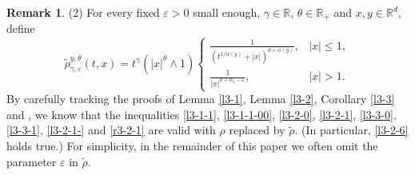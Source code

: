 \documentclass[a4paper,11pt]{amsart}
\renewcommand{\le}{\leqslant}
\newcommand{\R}{\mathds R}
\newcommand{\A}{\alpha}
\newcommand{\G}{\gamma}
\newcommand{\e}{ \varepsilon}
\theoremstyle{definition}
\newtheorem{remark}[theorem]{Remark}
\begin{document}
\begin{remark}
(2) For every fixed $\varepsilon>0$ small enough, $\G\in \R$,
$\theta \in \R_+$ and $x, y \in \R^d$, define
\begin{equation}\label{p3-1-7}
\tilde \rho_{\G,\e}^{y,\theta }(t,x)=t^{\G}(|x|^{\theta}\wedge
1)
\begin{cases}
\frac{1}{(t^{{1/\A(y)}}+|x|)^{d+\A(y)}},&  |x|\le 1,\\
\frac{1}{|x|^{d+\A_1-\varepsilon}},& |x|>1.
\end{cases}
\end{equation}
By carefully tracking the proofs of Lemma \ref{l3-1}, Lemma \ref{l3-2}, Corollary
\ref{l3-3} and  \cite[Lemma 2.1 (ii) and (iii)]{CZ}, we know that the inequalities \eqref{l3-1-1},
\eqref{l3-1-1-00},  \eqref{l3-2-0}, \eqref{l3-2-1}, \eqref{l3-3-0}, \eqref{l3-3-1},  \eqref{l3-2-1-} and \eqref{r3-2-1}
are valid with
$\rho$ replaced by $\tilde \rho$. (In particular, \eqref{l3-2-6} holds true.) For simplicity, in the remainder of this paper we often omit
the parameter $\e$ in $\tilde \rho$.
\end{remark}
\end{document}
